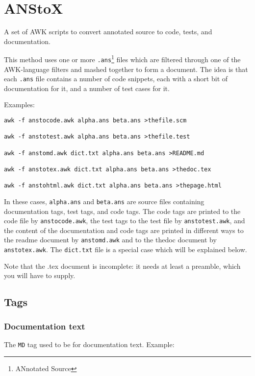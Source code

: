 
\part{ANStoX}
\label{anstox}

A set of AWK scripts to convert annotated source to code, tests, and documentation.


This method uses one or more \texttt{.ans}\footnote{ANnotated Source} files which are filtered through one of the AWK-language filters and mashed together to form a document. The idea is that each \texttt{.ans} file contains a number of code snippets, each with a short bit of documentation for it, and a number of test cases for it.


Examples:

\begin{verbatim}
awk -f anstocode.awk alpha.ans beta.ans >thefile.scm

awk -f anstotest.awk alpha.ans beta.ans >thefile.test

awk -f anstomd.awk dict.txt alpha.ans beta.ans >README.md

awk -f anstotex.awk dict.txt alpha.ans beta.ans >thedoc.tex

awk -f anstohtml.awk dict.txt alpha.ans beta.ans >thepage.html
\end{verbatim}

In these cases, \texttt{alpha.ans} and \texttt{beta.ans} are source files containing documentation tags, test tags, and code tags. The code tags are printed to the code file by \texttt{anstocode.awk}, the test tags to the test file by \texttt{anstotest.awk}, and the content of the documentation and code tags are printed in different ways to the readme document by \texttt{anstomd.awk} and to the thedoc document by \texttt{anstotex.awk}. The \texttt{dict.txt} file is a special case which will be explained below.


Note that the .tex document is incomplete: it needs at least a preamble, which you will have to supply.

\chapter{Tags}
\label{tags}
\section{Documentation text}
\label{documentation-text}

The \texttt{MD} tag used to be for documentation text. Example:

